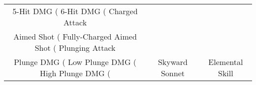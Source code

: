 \documentclass[a4paper,12pt]{article}
\begin{document}
\begin{tabular}{|c|c|c|}
5-Hit DMG (%
6-Hit DMG (%
Charged Attack \\
Aimed Shot (%
Fully-Charged Aimed Shot (%
Plunging Attack \\
Plunge DMG (%
Low Plunge DMG (%
High Plunge DMG (%
 & Skyward Sonnet & Elemental Skill \\

\end{tabular}
\end{document}
